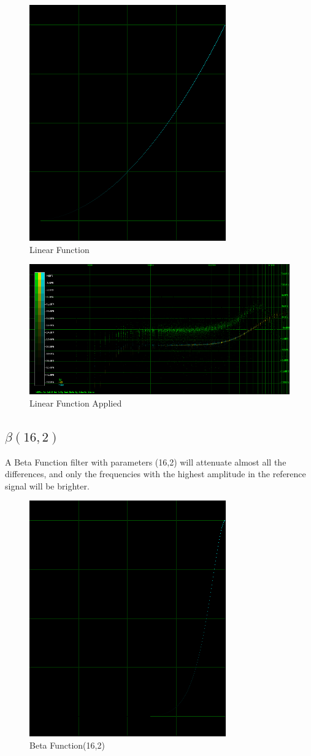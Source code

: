\documentclass[10pt,a4paper]{report}
\begin{document}
\begin{figure}[H]
	\centering
	\includegraphics[width=0.4\linewidth]{plots/BetaFunctionPlot_4}
	\caption[Linear]{Linear Function}
	\label{fig:betafunctionplot4}
\end{figure}

\begin{figure}[H]
	\centering
	\includegraphics[width=1\linewidth]{plots/BetaFunctionPlot_4_Data}
	\caption[Linear Applied]{Linear Function Applied}
	\label{fig:betafunctionplot4data}
\end{figure}

\newpage
\subsection{$\beta(16,2)$} 

A Beta Function filter with parameters (16,2) will attenuate almost all the differences, and only the frequencies with the highest amplitude in the reference signal will be brighter.

\begin{figure}[H]
	\centering
	\includegraphics[width=0.4\linewidth]{plots/BetaFunctionPlot_5}
	\caption[Beta Function(16,2)]{Beta Function(16,2)}
	\label{fig:betafunctionplot5}
\end{figure}
\end{document}
